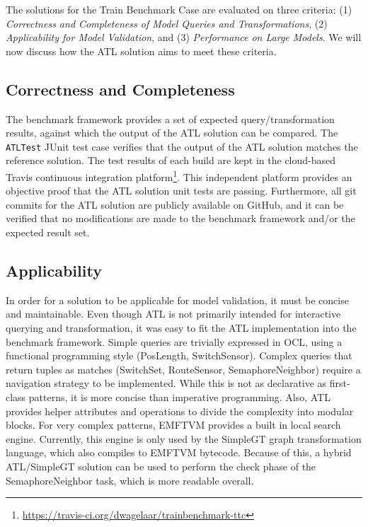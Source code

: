 \documentclass[submission,copyright,creativecommons]{eptcs}
\begin{document}
The solutions for the Train Benchmark Case are evaluated on three criteria: (1) \emph{Correctness and Completeness of Model Queries and Transformations}, (2) \emph{Applicability for Model Validation}, and (3) \emph{Performance on Large Models}. We will now discuss how the ATL solution aims to meet these criteria.

\subsection{Correctness and Completeness}

The benchmark framework provides a set of expected query/transformation results, against which the output of the ATL solution can be compared. The \texttt{ATLTest} JUnit test case verifies that the output of the ATL solution matches the reference solution. The test results of each build are kept in the cloud-based Travis continuous integration platform\footnote{\url{https://travis-ci.org/dwagelaar/trainbenchmark-ttc}}. This independent platform provides an objective proof that the ATL solution unit tests are passing. Furthermore, all git commits for the ATL solution are publicly available on GitHub, and it can be verified that no modifications are made to the benchmark framework and/or the expected result set.

\subsection{Applicability}

In order for a solution to be applicable for model validation, it must be concise and maintainable. Even though ATL is not primarily intended for interactive querying and transformation, it was easy to fit the ATL implementation into the benchmark framework. Simple queries are trivially expressed in OCL, using a functional programming style (PosLength, SwitchSensor). Complex queries that return tuples as matches (SwitchSet, RouteSensor, SemaphoreNeighbor) require a navigation strategy to be implemented. While this is not as declarative as first-class patterns, it is more concise than imperative programming. Also, ATL provides helper attributes and operations to divide the complexity into modular blocks. For very complex patterns, EMFTVM provides a built in local search engine. Currently, this engine is only used by the SimpleGT graph transformation language, which also compiles to EMFTVM bytecode. Because of this, a hybrid ATL/SimpleGT solution can be used to perform the check phase of the SemaphoreNeighbor task, which is more readable overall.
\end{document}
